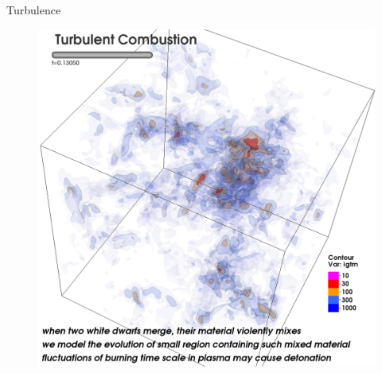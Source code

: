 \documentclass{beamer}
\begin{document}
\begin{frame}{Turbulence}
  \begin{figure}
    \center
    \includegraphics[scale=0.15]{tburn1.png}
  \end{figure}
\end{frame}
\end{document}
